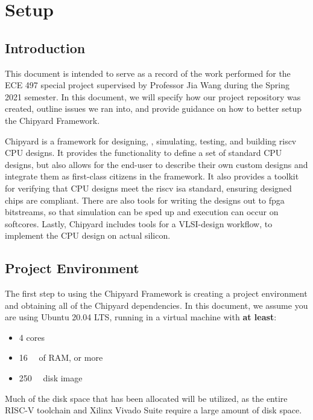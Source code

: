 \chapter{Setup}\label{chap:Setup}
\section{Introduction}\label{sec:Introduction}
This document is intended to serve as a record of the work performed for the ECE 497 special project supervised by Professor Jia Wang during the Spring 2021 semester.
In this document, we will specify how our project repository was created, outline issues we ran into, and provide guidance on how to better setup the Chipyard Framework.

Chipyard is a framework for designing, , simulating, testing, and building \Gls{riscv} CPU designs.
It provides the functionality to define a set of standard CPU designs, but also allows for the end-user to describe their own custom designs and integrate them as first-class citizens in the framework.
It also provides a toolkit for verifying that  CPU designs meet the \Gls{riscv} \Gls{isa} standard, ensuring designed chips are compliant.
There are also tools for writing the  designs out to \gls{fpga} bitstreams, so that simulation can be sped up and execution can occur on \glspl{softcore}.
Lastly, Chipyard includes tools for a VLSI-design workflow, to implement the  CPU design on actual silicon.

\section{Project Environment}\label{sec:Project_Environment}
The first step to using the Chipyard Framework is creating a project environment and obtaining all of the Chipyard dependencies.
In this document, we assume you are using Ubuntu 20.04 LTS, running in a virtual machine with \textbf{at least}:
\begin{itemize}
\item 4 cores
\item \SI{16}{\giga\byte} of RAM, or more
\item \SI{250}{\giga\byte} disk image
\end{itemize}

Much of the disk space that has been allocated will be utilized, as the entire RISC-V toolchain and Xilinx Vivado Suite require a large amount of disk space.

